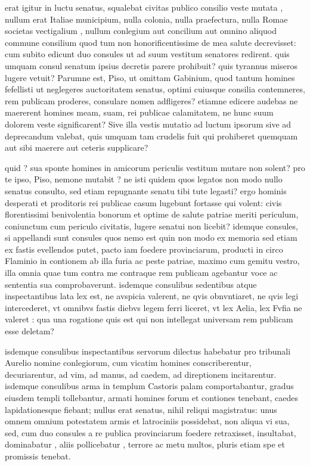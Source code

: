  erat igitur in luctu senatus, squalebat civitas publico consilio veste mutata , nullum erat Italiae municipium, nulla colonia, nulla praefectura, nulla Romae societas vectigalium , nullum conlegium aut concilium aut omnino aliquod commune consilium quod tum non honorificentissime de mea salute decrevisset: cum subito edicunt duo consules ut ad suum vestitum senatores redirent. quis umquam consul senatum ipsius decretis parere prohibuit? quis tyrannus miseros lugere vetuit? Parumne est, Piso, ut omittam Gabinium, quod tantum homines fefellisti ut neglegeres auctoritatem senatus, optimi cuiusque consilia contemneres, rem publicam proderes, consulare nomen adfligeres? etiamne edicere audebas ne maererent homines meam, suam, rei publicae calamitatem, ne hunc suum dolorem veste significarent? Sive illa vestis mutatio ad luctum ipsorum sive ad deprecandum valebat, quis umquam tam crudelis fuit qui prohiberet quemquam aut sibi maerere aut ceteris supplicare?

 quid ? sua sponte homines in amicorum periculis vestitum mutare non solent? pro te ipso, Piso, nemone mutabit ? ne isti quidem quos legatos non modo nullo senatus consulto, sed etiam repugnante senatu tibi tute legasti? ergo hominis desperati et proditoris rei publicae casum lugebunt fortasse qui volent: civis florentissimi benivolentia bonorum et optime de salute patriae meriti periculum, coniunctum cum periculo civitatis, lugere senatui non licebit? idemque consules, si appellandi sunt consules quos nemo est quin non modo ex memoria sed etiam ex fastis evellendos putet, pacto iam foedere provinciarum, producti in circo Flaminio in contionem ab illa furia ac peste patriae, maximo cum gemitu vestro, illa omnia quae tum contra me contraque rem publicam agebantur voce ac sententia sua comprobaverunt. isdemque consulibus sedentibus atque inspectantibus lata lex est, ne avspicia valerent, ne qvis obnvntiaret, ne qvis legi intercederet, vt omnibvs fastis diebvs legem ferri liceret, vt lex Aelia, lex Fvfia ne valeret : qua una rogatione quis est qui non intellegat universam rem publicam esse deletam?

 isdemque consulibus inspectantibus servorum dilectus habebatur pro tribunali Aurelio nomine conlegiorum, cum vicatim homines conscriberentur, decuriarentur, ad vim, ad manus, ad caedem, ad direptionem incitarentur. isdemque consulibus arma in templum Castoris palam comportabantur, gradus eiusdem templi tollebantur, armati homines forum et contiones tenebant, caedes lapidationesque fiebant; nullus erat senatus, nihil reliqui magistratus: unus omnem omnium potestatem armis et latrociniis possidebat, non aliqua vi sua, sed, cum duo consules a re publica provinciarum foedere retraxisset, insultabat, dominabatur , aliis pollicebatur , terrore ac metu multos, pluris etiam spe et promissis tenebat.

